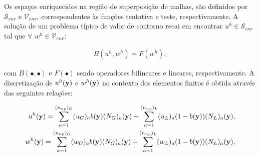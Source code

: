 \begin{figure}[H]
	\label{fig:domains}
\end{figure}

Os espaços enriquecidos na região de superposição de malhas, são definidos por $\mathcal{S}_{enr}$ e $\mathcal{V}_{enr}$, correspondentes às funções tentativa e teste, respectivamente. A solução de um problema típico de valor de contorno recai em encontrar $u^{h} \in \mathcal{S}_{enr}$ tal que $\forall$ $ w^{h} \in \mathcal{V}_{enr}$: 

\begin{align}
	B(u^{h},w^{h}) = F(w^{h}),
\end{align}

\noindent com $B(\bullet,\bullet)$ e $F(\bullet)$ sendo operadores bilineares e lineares, respectivamente. A discretização de $u^{h}(\mathbf{y})$ e $w^{h}(\mathbf{y})$ no contexto dos elementos finitos é obtida através das seguintes relações:

\begin{align}
	u^{h}(\mathbf{y}) = \sum_{a = 1}^{(n_{np})_G} (u_{G})_{a}b(\mathbf{y})(N_{G})_{a}(\mathbf{y}) + \sum_{a = 1}^{(n_{np})_L} (u_{L})_{a}(1-b(\mathbf{y}))(N_{L})_{a}(\mathbf{y}),\label{eq:u_mod} \\ 
	w^{h}(\mathbf{y}) = \sum_{a = 1}^{(n_{np})_G} (w_{G})_{a}b(\mathbf{y})(N_{G})_{a}(\mathbf{y}) + \sum_{a = 1}^{(n_{np})_L} (w_{L})_{a}(1-b(\mathbf{y}))(N_{L})_{a}(\mathbf{y}), \label{eq:w_mod}
\end{align}

